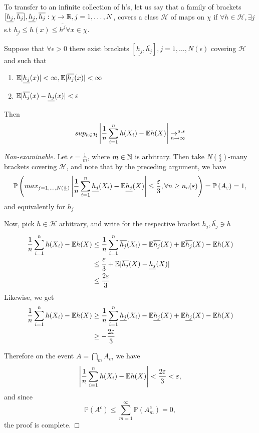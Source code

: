 \documentclass[a4paper]{article}
\begin{document}
To transfer to an infinite collection of h's, let us say that a family of brackets $[\underline{h_j}, \overline{h_j}], \underline{h_j}, \overline{h_j} : \chi \to \mathbb{R}, j=1,\ldots,N$, covers a class $\mathcal{H}$ of maps on $\chi$ if  $\forall h \in  \mathcal{H}, \exists j$ s.t $\underline{h_j} \le h(x) \le \overline{h^{j}} \forall x \in \chi$.

\begin{prop}
	Suppose that $\forall \epsilon > 0$ there exist brackets $[\underline{h_j}, \overline{h_j}], j=1,\ldots,N(\epsilon)$ covering $\mathcal{H}$ and such that
	\begin{enumerate}
		\item $\mathbb{E} |\underline{h_j}(x) | < \infty, \mathbb{E}|\overline{h_j}(x)| < \infty$
		\item $\mathbb{E} |\overline{h_j}(x) - \underline{h_j}(x)| < \varepsilon$
	\end{enumerate}
	Then
	\[
		sup_{h \in \mathcal{H}} \left| \frac{1}{n} \sum_{i=1}^{n} h(X_i) - \mathbb{E} h(X) \right| \underset{n \to \infty}{\to^{a.s} }
	\] 
\end{prop}

\begin{proof}[Non-examinable]
	Let $\epsilon = \frac{1}{m}$, where $m \in \mathbb{N}$ is arbitrary. Then take $N(\frac{\epsilon}{3})$-many brackets covering $\mathcal{H}$, and note that by the preceding argument, we have
	\[
		\mathbb{P}\left( max_{j=1,\ldots,N(\frac{\varepsilon}{3})} \left| \frac{1}{n}\sum_{i=1}^{n} \underline{h_j} (X_i) - \mathbb{E} \underline{h_j} (X) \right| \le  \frac{\varepsilon}{3}, \forall n \ge n_o (\varepsilon) \right) = \mathbb{P}\left( A_{\varepsilon} \right) = 1
	,\] and equivalently for $\overline{h_j}$

	Now, pick $h \in  \mathcal{H}$ arbitrary, and write for the respective bracket $\underline{h_j}, \overline{h_j} \ni h$ 
	\begin{align*}
		\frac{1}{n} \sum_{i=1}^{n}h(X_i) - \mathbb{E} h(X) &\le \frac{1}{n}\sum_{i=1}^{n} \overline{h_j}(X_i) - \mathbb{E} \overline{h_j}(X) + \mathbb{E} \overline{h_j} (X) - \mathbb{E} h(X) \\
		&\le \frac{\varepsilon}{3} + \mathbb{E} |\overline{h_j}(X) - \underline{h_j} (X) |  \\
		&\le \frac{2\varepsilon}{3}
	\end{align*}
	Likewise, we get
	\begin{align*}
		\frac{1}{n} \sum_{i=1}^{n}h(X_i) - \mathbb{E} h(X) &\ge \frac{1}{n}\sum_{i=1}^{n} \underline{h_j}(X_i) - \mathbb{E} \underline{h_j}(X) + \mathbb{E} \underline{h_j} (X) - \mathbb{E} h(X) \\
		&\ge - \frac{2\varepsilon}{3}
	\end{align*}

	Therefore on the event $A = \bigcap_{m} A_m $ we have
	\[
		\left| \frac{1}{n} \sum_{i=1}^{n} h(X_i) - \mathbb{E} h(X) \right| < \frac{2\varepsilon}{3} < \varepsilon
	,\] and since
	\[
	\mathbb{P}\left( A^{c} \right) \le \sum_{m=1}^{\infty} \mathbb{P}\left( A_m^{c} \right) = 0
	,\] the proof is complete.
\end{proof}
\end{document}
